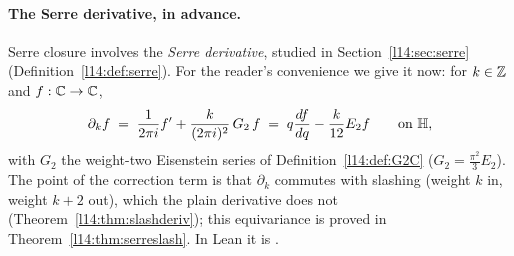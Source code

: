 \paragraph{The Serre derivative, in advance.} Serre closure involves the \emph{Serre derivative}, studied in
Section~\ref{l14:sec:serre} (Definition~\ref{l14:def:serre}). For the reader's convenience we give it now: for $k\in{\mathbb{Z}}$ and
$f:{\mathbb{C}}\to{\mathbb{C}}$,
\begin{equation*}
  \partial_kf \;=\; \frac{1}{2\pi i}f' + \frac{k}{(2\pi i)^2}\,G_2\,f \;=\; q\frac{df}{dq} - \frac{k}{12}E_2f\qquad\text{on }\mathbb{H},
\end{equation*}
with $G_2$ the weight-two Eisenstein series of Definition~\ref{l14:def:G2C} ($G_2 = \frac{\pi^2}3E_2$). The point of the
correction term is that $\partial_k$ commutes with slashing (weight $k$ in, weight $k+2$ out), which the plain derivative does
not (Theorem~\ref{l14:thm:slashderiv}); this equivariance is proved in Theorem~\ref{l14:thm:serreslash}. In Lean it is
.

